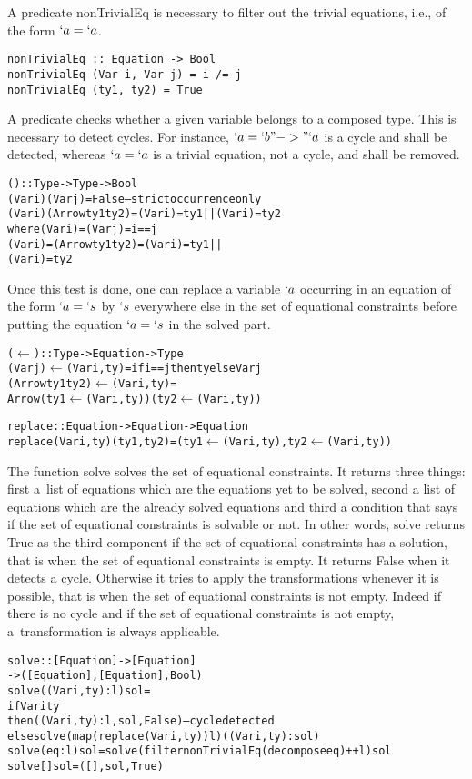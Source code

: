 \documentclass{jfp1}
\begin{document}
A predicate \textsf{nonTrivialEq} is necessary to filter out the trivial
equations, i.e., of the form $`a=`a$.
\begin{verbatim}
nonTrivialEq :: Equation -> Bool
nonTrivialEq (Var i, Var j) = i /= j
nonTrivialEq (ty1, ty2) = True
\end{verbatim}
A predicate {\EUR} checks whether a given variable belongs to a composed type. This
is necessary to detect cycles. For instance, $`a = `b "->" `a$ is a cycle and shall
be detected, whereas $`a = `a$ is a trivial equation, not a cycle, and shall be
removed.
\begin{alltt} 
(\EUR) :: Type -> Type -> Bool 
(Var i) \EUR (Var j) = False -- strict occurrence only
(Var i) \EUR (Arrow ty1 ty2) =  (Var i) \EUR= ty1 || (Var i) \EUR= ty2
    where (Var i) \EUR= (Var j) = i == j
          (Var i) \EUR= (Arrow ty1 ty2) = (Var i) \EUR= ty1 || 
                                       (Var i) \EUR= ty2
\end{alltt}
Once this test is done, one can replace a variable $`a$ occurring in an equation of
the form $`a = `s$ by $`s$ everywhere else in the set of equational constraints
before putting the equation $`a=`s$ in the solved part.
\pagebreak[4]
\begin{alltt}
(\(\leftarrow\)) :: Type -> Equation -> Type
(Var j) \(\leftarrow\) (Var i, ty) = if i == j then ty else Var j
(Arrow ty1 ty2) \(\leftarrow\) (Var i, ty) = 
  Arrow (ty1 \(\leftarrow\) (Var i, ty)) (ty2 \(\leftarrow\) (Var i, ty))

replace::  Equation -> Equation -> Equation
replace (Var i,ty) (ty1,ty2) = (ty1 \(\leftarrow\) (Var i,ty),  ty2 \(\leftarrow\) (Var i,ty))
\end{alltt}
The function \textsf{solve} solves the set of equational constraints.  It returns three things:
first a~list of equations which are the equations yet to be solved, second a list of
equations which are the already solved equations and third a condition that says if the set
of equational constraints is solvable or not.  In other words, \textsf{solve} returns
\textsf{True} as the third component if the set of equational constraints has a solution, that
is when the set of equational constraints is empty.  It returns \textsf{False} when it detects a
cycle. Otherwise it tries to apply the transformations whenever it is possible, that
is when the set of equational constraints is not empty. Indeed if there is no cycle and if the
set of equational constraints is not empty, a~transformation is always applicable.
\begin{normalsize}
\begin{alltt}
solve :: [Equation] -> [Equation]
                    -> ([Equation],[Equation],Bool)
solve ((Var i,ty):l) sol = 
  if Var i \EUR ty 
  then ((Var i,ty):l,sol,False) -- cycle detected
  else solve (map (replace (Var i,ty)) l) ((Var i,ty):sol)
solve (eq:l) sol = solve (filter nonTrivialEq (decompose eq) ++ l) sol
solve [] sol = ([],sol,True)
\end{alltt}
\end{normalsize}
\end{document}

